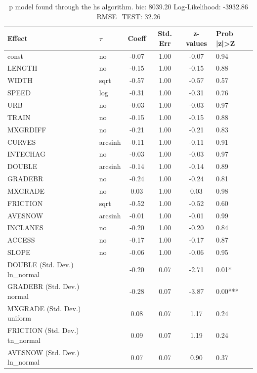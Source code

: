 \begin{table}
	\caption{p model found through the hs algorithm. bic: 8039.20 Log-Likelihood: -3932.86 RMSE_TEST: 32.26}
	\begin{center}
		\begin{tabular}{|l|l|c|c|c|l|}
			\hline
			Effect & $\tau$ & Coeff & Std. Err & z-values & Prob |z|>Z \\
			\hline
			const & no & -0.07 & 1.00 & -0.07 & 0.94 \\
			\hline
			LENGTH & no & -0.15 & 1.00 & -0.15 & 0.88 \\
			\hline
			WIDTH & sqrt & -0.57 & 1.00 & -0.57 & 0.57 \\
			\hline
			SPEED & log & -0.31 & 1.00 & -0.31 & 0.76 \\
			\hline
			URB & no & -0.03 & 1.00 & -0.03 & 0.97 \\
			\hline
			TRAIN & no & -0.15 & 1.00 & -0.15 & 0.88 \\
			\hline
			MXGRDIFF & no & -0.21 & 1.00 & -0.21 & 0.83 \\
			\hline
			CURVES & arcsinh & -0.11 & 1.00 & -0.11 & 0.91 \\
			\hline
			INTECHAG & no & -0.03 & 1.00 & -0.03 & 0.97 \\
			\hline
			DOUBLE & arcsinh & -0.14 & 1.00 & -0.14 & 0.89 \\
			\hline
			GRADEBR & no & -0.24 & 1.00 & -0.24 & 0.81 \\
			\hline
			MXGRADE & no & 0.03 & 1.00 & 0.03 & 0.98 \\
			\hline
			FRICTION & sqrt & -0.52 & 1.00 & -0.52 & 0.60 \\
			\hline
			AVESNOW & arcsinh & -0.01 & 1.00 & -0.01 & 0.99 \\
			\hline
			INCLANES & no & -0.20 & 1.00 & -0.20 & 0.84 \\
			\hline
			ACCESS & no & -0.17 & 1.00 & -0.17 & 0.87 \\
			\hline
			SLOPE & no & -0.06 & 1.00 & -0.06 & 0.95 \\
			\hline
			DOUBLE (Std. Dev.) ln_normal &  & -0.20 & 0.07 & -2.71 & 0.01* \\
			\hline
			GRADEBR (Std. Dev.) normal &  & -0.28 & 0.07 & -3.87 & 0.00*** \\
			\hline
			MXGRADE (Std. Dev.) uniform &  & 0.08 & 0.07 & 1.17 & 0.24 \\
			\hline
			FRICTION (Std. Dev.) tn_normal &  & 0.09 & 0.07 & 1.19 & 0.24 \\
			\hline
			AVESNOW (Std. Dev.) ln_normal &  & 0.07 & 0.07 & 0.90 & 0.37 \\

\end{tabular}
\end{center}
\end{table}
